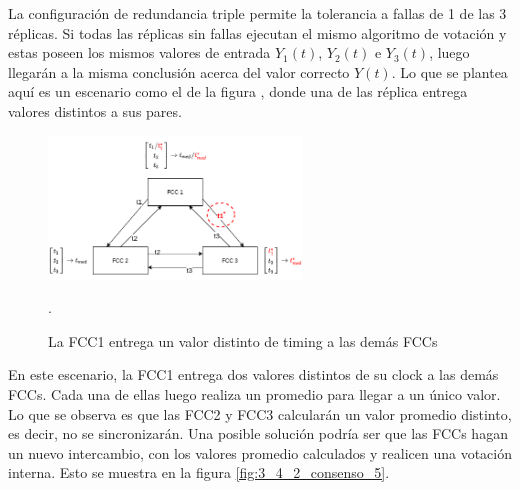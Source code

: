 
La configuración de redundancia triple permite la tolerancia a fallas de 1 de las 3 réplicas. Si todas las réplicas sin fallas ejecutan el mismo algoritmo de votación y estas poseen los mismos valores de entrada $Y_1(t)$, $Y_2(t)$ e $Y_3(t)$, luego llegarán a la misma conclusión acerca del valor correcto $Y(t)$. Lo que se plantea aquí es un escenario como el de la figura , donde una de las réplica entrega valores distintos a sus pares.


\begin{figure}[H]
    \centering
    \includegraphics[width=0.6\textwidth]{img/3_4_2_consenso_4.png}
    \caption{La FCC1 entrega un valor distinto de timing a las demás FCCs}.
    \label{fig:3_4_2_consenso_4}
\end{figure}

En este escenario, la FCC1 entrega dos valores distintos de su clock a las demás FCCs. Cada una de ellas luego realiza un promedio para llegar a un único valor. Lo que se observa es que las FCC2 y FCC3 calcularán un valor promedio distinto, es decir, no se sincronizarán.
Una posible solución podría ser que las FCCs hagan un nuevo intercambio, con los valores promedio calculados y realicen una votación interna. Esto se muestra en la figura \ref{fig:3_4_2_consenso_5}.

